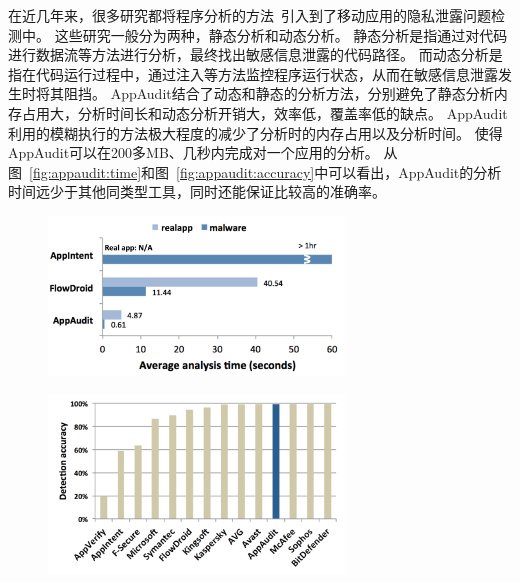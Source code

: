 在近几年来，很多研究都将程序分析的方法~\supercite{appintent,flowdroid,pios,zhang2013vetting,jiang2013detecting}引入到了移动应用的隐私泄露问题检测中。
这些研究一般分为两种，静态分析和动态分析。
静态分析是指通过对代码进行数据流等方法进行分析，最终找出敏感信息泄露的代码路径。
而动态分析是指在代码运行过程中，通过注入等方法监控程序运行状态，从而在敏感信息泄露发生时将其阻挡。
AppAudit结合了动态和静态的分析方法，分别避免了静态分析内存占用大，分析时间长和动态分析开销大，效率低，覆盖率低的缺点。
AppAudit利用的模糊执行的方法极大程度的减少了分析时的内存占用以及分析时间。
使得AppAudit可以在200多MB、几秒内完成对一个应用的分析。
从图~\ref{fig:appaudit:time}和图~\ref{fig:appaudit:accuracy}中可以看出，AppAudit的分析时间远少于其他同类型工具，同时还能保证比较高的准确率。

\begin{figure}
	\centering
	\includegraphics[width=0.7\textwidth]{figure/appaudit-time.png}
\end{figure}

\begin{figure}
	\centering
	\includegraphics[width=0.7\textwidth]{figure/appaudit-accuracy.png}
\end{figure}

